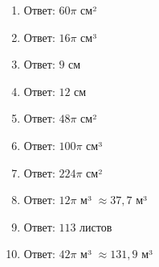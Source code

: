 \documentclass{umk-matematika}
\begin{document}
\begin{enumerate}
  \item Ответ: $60\pi$ см²
  \item Ответ: $16\pi$ см³
  \item Ответ: $9$ см
  \item Ответ: $12$ см
  \item Ответ: $48\pi$ см²
  \item Ответ: $100\pi$ см³
  \item Ответ: $224\pi$ см²
  \item Ответ: $12\pi$ м³ $\approx 37{,}7$ м³
  \item Ответ: $113$ листов
  \item Ответ: $42\pi$ м³ $\approx 131{,}9$ м³
\end{enumerate}
\end{document}
